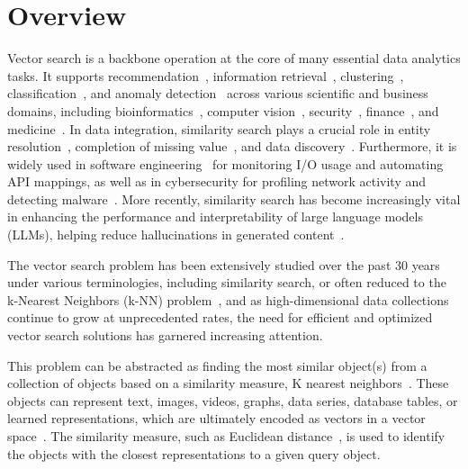 \section{Overview}
\label{sec:overview}
Vector search is a backbone operation at the core of many essential data analytics tasks. It supports recommendation~\cite{conf/kdd/wang2018,amazon}, 
information retrieval~\cite{conf/williams2014}, clustering~\cite{journal/JMLR/bubeck2009,journal/pattrecog/Warren2005}, 
classification~\cite{classification,pros},
and anomaly detection~\cite{discord,norma,series2graph,landmines,nba,landmines,DBLP:journals/datamine/LinardiZPK20,DBLP:journals/pvldb/BoniolPPF21,DBLP:journals/pvldb/PaparrizosKBTPF22,DBLP:journals/pvldb/PaparrizosBPTEF22} across various scientific and business domains, including bioinformatics~\cite{biof1,biof2}, 
computer vision~\cite{cv1,cv2}, 
security~\cite{cybersecurity,cyb2}, 
finance~\cite{finance1,finance2}, 
and 
medicine~\cite{medcine1,medicin2}. 
In data integration, similarity search plays a crucial role in entity resolution~\cite{journal/pvldb/ebraheem2018}, completion of missing value~\cite{retro}, and data discovery~\cite{journal/pvldb/zhu2016}. Furthermore, it is widely used in software engineering~\cite{journal/pacml/uri2019,conf/icsec/nguyen2016} for monitoring I/O usage and automating API mappings, as well as in cybersecurity for profiling network activity and detecting malware~\cite{cybersecurity,cyb2}. More recently, similarity search has become increasingly vital in enhancing the performance and interpretability of large language models (LLMs), helping reduce hallucinations in generated content~\cite{retrieval-diffusion-models,dense-passage-retrieval,seq2seq,rag-nlp,rag0,rag1,rag2,rag3}.

The vector search problem has been extensively studied over the past 30 years~\cite{hnsw,hercules,rng,hydra1,hydra2} under various terminologies, including similarity search, or often reduced to the k-Nearest Neighbors (k-NN) problem~\cite{conf/icde/echihabi2021,conf/sigmod/echihabi2020,gogolou2019progressive}, and as high-dimensional data collections continue to grow at unprecedented rates, the need for efficient and optimized vector search solutions has garnered increasing attention.

This problem can be abstracted as finding the most similar object(s) from a collection of objects based on a similarity measure, K nearest neighbors~\cite{conf/sigmod/echihabi2020, aumuller2017ann,ann-benchmark-journal}. These objects can represent text, images, videos, graphs, data series, database tables, or learned representations, which are ultimately encoded as vectors in a vector space~\cite{hydra1,hydra2,DBLP:conf/edbt/EchihabiZP21,conf/sigmod/echihabi2020}. The similarity measure, such as Euclidean distance~\cite{euclid}, is used to identify the objects with the closest representations to a given query object.

